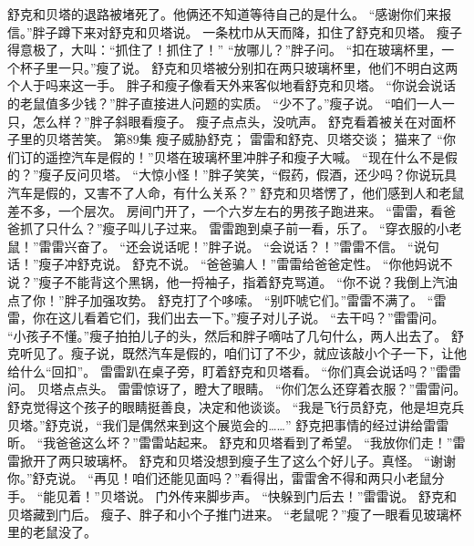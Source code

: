 \documentclass[a4paper,12pt,UTF8,twoside]{ctexbook}
\begin{document}
        舒克和贝塔的退路被堵死了。他俩还不知道等待自己的是什么。 
        “感谢你们来报信。”胖子蹲下来对舒克和贝塔说。 
        一条枕巾从天而降，扣住了舒克和贝塔。 
        瘦子得意极了，大叫：“抓住了！抓住了！” 
        “放哪儿？”胖子问。 
        “扣在玻璃杯里，一个杯子里一只。”瘦了说。 
        舒克和贝塔被分别扣在两只玻璃杯里，他们不明白这两个人于吗来这一手。 
        胖子和瘦子像看天外来客似地看舒克和贝塔。 
        “你说会说话的老鼠值多少钱？”胖子直接进人问题的实质。 
        “少不了。”瘦子说。 
        “咱们一人一只，怎么样？”胖子斜眼看瘦子。 
        瘦子点点头，没吭声。 
        舒克看着被关在对面杯子里的贝塔苦笑。       第89集 
        瘦子威胁舒克； 
        雷雷和舒克、贝塔交谈； 
        猫来了   
        “你们订的遥控汽车是假的！”贝塔在玻璃杯里冲胖子和瘦子大喊。 
        “现在什么不是假的？”瘦子反问贝塔。 
        “大惊小怪！”胖子笑笑，“假药，假酒，还少吗？你说玩具汽车是假的，又害不了人命，有什么关系？” 
        舒克和贝塔愣了，他们感到人和老鼠差不多，一个层次。 
        房间门开了，一个六岁左右的男孩子跑进来。 
        “雷雷，看爸爸抓了只什么？”瘦子叫儿子过来。 
        雷雷跑到桌子前一看，乐了。 
        “穿衣服的小老鼠！”雷雷兴奋了。 
        “还会说话呢！”胖子说。 
        “会说话？！”雷雷不信。 
        “说句话！”瘦子冲舒克说。 
        舒克不说。 
        “爸爸骗人！”雷雷给爸爸定性。 
        “你他妈说不说？”瘦子不能背这个黑锅，他一捋袖子，指着舒克骂道。 
        “你不说？我倒上汽油点了你！”胖子加强攻势。 
        舒克打了个哆嗦。 
        “别吓唬它们。”雷雷不满了。 
        “雷雷，你在这儿看着它们，我们出去一下。”瘦子对儿子说。 
        “去干吗？”雷雷问。 
        “小孩子不懂。”瘦子拍拍儿子的头，然后和胖子嘀咕了几句什么，两人出去了。 
        舒克听见了。瘦子说，既然汽车是假的，咱们订了不少，就应该敲小个子一下，让他给什么“回扣”。 
        雷雷趴在桌子旁，盯着舒克和贝塔看。 
        “你们真会说话吗？”雷雷问。 
        贝塔点点头。 
        雷雷惊讶了，瞪大了眼睛。 
        “你们怎么还穿着衣服？”雷雷问。 
        舒克觉得这个孩子的眼睛挺善良，决定和他谈谈。 
        “我是飞行员舒克，他是坦克兵贝塔。”舒克说，“我们是偶然来到这个展览会的……” 
        舒克把事情的经过讲给雷雷昕。 
        “我爸爸这么坏？”雷雷站起来。 
        舒克和贝塔看到了希望。 
        “我放你们走！”雷雷掀开了两只玻璃杯。 
        舒克和贝塔没想到瘦子生了这么个好儿子。真怪。 
        “谢谢你。”舒克说。 
        “再见！咱们还能见面吗？”看得出，雷雷舍不得和两只小老鼠分手。 
        “能见着！”贝塔说。 
        门外传来脚步声。 
        “快躲到门后去！”雷雷说。 
        舒克和贝塔藏到门后。 
        瘦子、胖子和小个子推门进来。 
        “老鼠呢？”瘦了一眼看见玻璃杯里的老鼠没了。 
\end{document}
